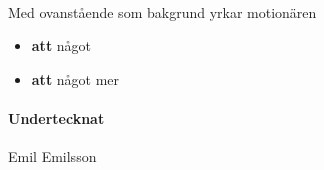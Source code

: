 \documentclass[a4paper, 12pt]{article}
\begin{document}
\paragraph{}
Med ovanstående som bakgrund yrkar motionären

\begin{itemize}
  \setlength\itemsep{0.2em}
  \item \textbf{att} något
  \item \textbf{att} något mer
\end{itemize}


\paragraph{Undertecknat} Emil Emilsson

\end{document}
